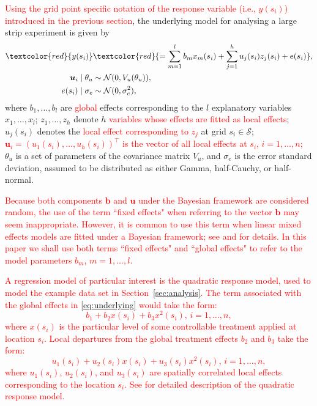 \documentclass[a4paper]{article}   	%
\newcommand{\N}{\mathcal{N}}
\begin{document}
\textcolor{red}{Using the grid point specific notation of the response variable (i.e., $y(s_i)$) introduced in the previous section}, the underlying model for analysing a large strip experiment is given by 
	\begin{equation}\label{eq:underlying}
		\begin{split}
			\textcolor{red}{y(s_i)} & \textcolor{red}{= \sum_{m=1}^{l}b_m x_m(s_i) + \sum_{j=1}^{h}u_j(s_i)z_j(s_i)+e(s_i)}, \\
			\bm{u}_i \mid \theta_u &\sim \N(0,V_u(\theta_u)), \\
			e(s_i) \mid \sigma_e &\sim \N(0,\sigma_e^2), 
		\end{split}
	\end{equation}
	where $b_1, \ldots, b_l$ are \textcolor{red}{global} effects corresponding to the $l$ explanatory variables $x_1,\ldots, x_l$; $z_1,\ldots, z_h$ denote $h$ \textcolor{red}{variables whose effects are fitted as local effects}; $u_j(s_i)$ denotes the \textcolor{red}{local effect corresponding to $z_j$} at grid $s_i\in\mathcal{S}$; \textcolor{red}{$\bm{u}_i=(u_1(s_i),\ldots,u_h(s_i))^{\top}$ is the vector of all local effects at $s_i$, $i=1,\ldots,n$;} $\theta_u$ is a set of parameters of the covariance matrix $V_u$, and $\sigma_e$ is the error standard deviation, assumed to be distributed as either Gamma, half-Cauchy, or half-normal. 
	
	\textcolor{red}{Because both components $\bm{b}$ and $\bm{u}$ under the Bayesian framework are considered random, the use of the term ``fixed effects" when referring to the vector $\bm{b}$ may seem inappropriate. However, it is common to use this term when linear mixed effects models are fitted under a Bayesian framework; see \textcite{zhao2006general} and \textcite{fong2010bayesian} for details. In this paper we shall use both terms ``fixed effects" and ``global effects" to refer to the model parameters $b_m$, $m=1,\ldots,l$.}
	
	\textcolor{red}{A regression model of particular interest is the quadratic response model, used to model the example data set in Section~\ref{sec:analysis}. The term associated with the global effects in \eqref{eq:underlying} would take the form:
	\begin{equation}
	 b_{1} + b_{2} x(s_{i}) + b_{3} x^{2}(s_{i}), \, i=1,\ldots, n,
	\end{equation}
	where $x(s_{i})$ is the particular level of some controllable treatment applied at location $s_{i}$. Local departures from the global treatment effects $b_{2}$ and $b_{3}$ take the form:
	\begin{equation}
	    u_{1}(s_{i}) + u_{2}(s_{i}) x(s_{i}) + u_{3}(s_{i}) x^{2}(s_{i}), \, i=1,\ldots, n,
	\end{equation}
	where $u_{1}(s_{i})$, $u_{2}(s_{i})$, and $u_{3}(s_{i})$ are spatially correlated local effects corresponding to the location $s_{i}$. See \textcite{Piepho2011Statistical} for detailed description of the quadratic response model.}
	
\end{document}
